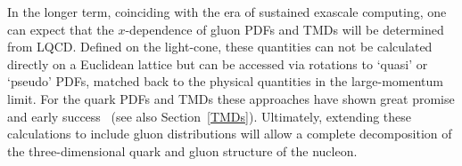 
In the longer term, coinciding with the era of sustained exascale computing, one can expect that the $x$-dependence of gluon PDFs and TMDs will be determined from LQCD. Defined on the light-cone, these quantities can not be calculated directly on a Euclidean lattice but can be accessed via rotations to `quasi' or `pseudo' PDFs, matched back to the physical quantities in the large-momentum limit. For the quark PDFs and TMDs these approaches have shown great promise and early success~\cite{Lin:2014zya,Alexandrou:2015rja} (see also Section~\ref{TMDs}). Ultimately, extending these calculations to include gluon distributions will allow a complete decomposition of the three-dimensional quark and gluon structure of the nucleon. 

